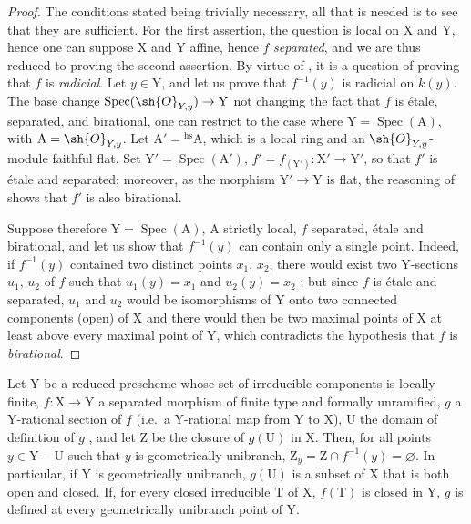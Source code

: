 \begin{proof}
The conditions stated being trivially necessary, all that is needed is to see that they are sufficient.
For the first assertion, the question is local on $\mathrm{X}$ and $\mathrm{Y}$, hence one can suppose $\mathrm{X}$ and $\mathrm{Y}$ affine, hence $f$ \emph{separated}, and we are thus reduced to proving the second assertion.
By virtue of , it is a question of proving that $f$ is \emph{radicial}.
Let $y\in\mathrm{Y}$, and let us prove that $f^{-1}(y)$ is radicial on $k(y)$.
The base change $\operatorname{Spec}(\sh{O}_{Y,y})\to\mathrm{Y}$ not changing the fact that $f$ is \'etale, separated, and birational, one can restrict to the case where $\mathrm{Y}=\operatorname{Spec}(\mathrm{A})$, with $\mathrm{A}=\sh{O}_{Y,y}$.
Let $\mathrm{A}'={}^{\mathrm{hs}}\mathrm{A}$, which is a local ring and an $\sh{O}_{Y,y}$-module faithful flat.
Set $\mathrm{Y}'=\operatorname{Spec}(\mathrm{A}')$, $f'=f_{(\mathrm{Y}')}:\mathrm{X}'\to\mathrm{Y}'$, so that $f'$ is \'etale and separated; moreover, as the morphism $\mathrm{Y}'\to\mathrm{Y}$ is flat, the reasoning of  shows that $f'$ is also birational.

Suppose therefore $\mathrm{Y}=\operatorname{Spec}(\mathrm{A})$, $\mathrm{A}$ strictly local, $f$ separated, \'etale and birational, and let us show that $f^{-1}(y)$ can contain only a single point.
Indeed, if $f^{-1}(y)$ contained two distinct points $x_1$, $x_2$, there would exist two $\mathrm{Y}$-sections $u_1$, $u_2$ of $f$ such that $u_1(y)=x_1$ and $u_2(y)=x_2$ ; but since $f$ is \'etale and separated, $u_1$ and $u_2$ would be isomorphisms of $\mathrm{Y}$ onto two connected components (open) of $\mathrm{X}$  and there would then be two maximal points of $\mathrm{X}$ at least above every maximal point of $\mathrm{Y}$, which contradicts the hypothesis that $f$ is \emph{birational}.
\end{proof}

\begin{proposition}[18.10.19]
\label{IV.18.10.19}
Let $\mathrm{Y}$ be a reduced prescheme whose set of irreducible components is locally finite, $f:\mathrm{X}\to\mathrm{Y}$ a separated morphism of finite type and formally unramified, $g$ a $\mathrm{Y}$-rational section of $f$ (i.e.\ a $\mathrm{Y}$-rational map from $\mathrm{Y}$ to $\mathrm{X}$), $\mathrm{U}$ the domain of definition of $g$ , and let $\mathrm{Z}$ be the closure of $g(\mathrm{U})$ in $\mathrm{X}$.
Then, for all points $y\in\mathrm{Y}-\mathrm{U}$ such that $y$ is geometrically unibranch, $\mathrm{Z}_y=\mathrm{Z}\cap f^{-1}(y)=\varnothing$.
In particular, if $\mathrm{Y}$ is geometrically unibranch, $g(\mathrm{U})$ is a subset of $\mathrm{X}$ that is both open and closed.
If, for every closed irreducible $\mathrm{T}$ of $\mathrm{X}$, $f(\mathrm{T})$ is closed in $\mathrm{Y}$, $g$ is defined at every geometrically unibranch point of $\mathrm{Y}$.
\end{proposition}


